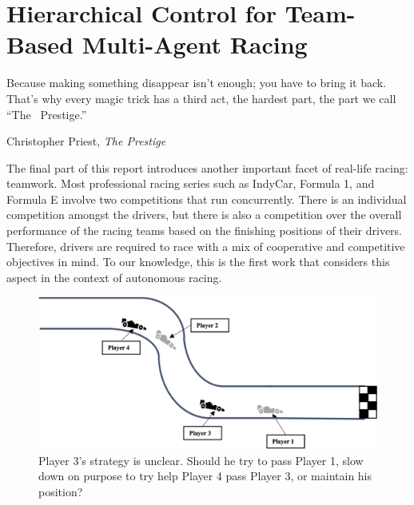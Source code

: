 \chapter{Hierarchical Control for Team-Based Multi-Agent Racing}
\epigraph{\flushright Because making something disappear isn't enough; you have to bring it back. That's why every magic trick has a third act, the hardest part, the part we call ``The~ Prestige.''}{Christopher Priest, \textit{The Prestige}}
\label{chapter:team}
The final part of this report introduces another important facet of real-life racing: teamwork. Most professional racing series such as IndyCar, Formula 1, and Formula E involve two competitions that run concurrently. There is an individual competition amongst the drivers, but there is also a competition over the overall performance of the racing teams based on the finishing positions of their drivers. Therefore, drivers are required to race with a mix of cooperative and competitive objectives in mind. To our knowledge, this is the first work that considers this aspect in the context of autonomous racing. 

\begin{figure}
  \centering
  \includegraphics[width=\textwidth]{Figures/TeamMotiv.png}
  \caption[Motivating example for team-based racing] {Player 3's strategy is unclear. Should he try to pass Player 1, slow down on purpose to try help Player 4 pass Player 3, or maintain his position?}
  \label{fig:team_motivating}
\end{figure}


